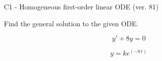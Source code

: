 \begin{exercise}
  \begin{exerciseTitle}C1 - Homogeneous first-order linear ODE (ver. 81)\end{exerciseTitle}
  \begin{exerciseStatement}
    
Find the general solution to the given ODE.

    
\[y'+8y=0\]

  \end{exerciseStatement}
  \begin{exerciseAnswer}
    
\[y= k e^{\left(-8 \, t\right)}\]

  \end{exerciseAnswer}
\end{exercise}